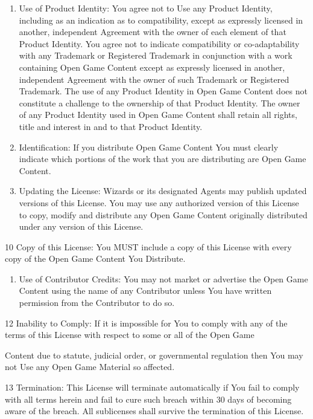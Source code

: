 \begin{multicols}{2}
\begin{enumerate}
\def\labelenumi{\arabic{enumi}.}
\setcounter{enumi}{6}
\item
  Use of Product Identity: You agree not to Use any Product Identity,
  including as an indication as to compatibility, except as expressly
  licensed in another, independent Agreement with the owner of each
  element of that Product Identity. You agree not to indicate
  compatibility or co-adaptability with any Trademark or Registered
  Trademark in conjunction with a work containing Open Game Content
  except as expressly licensed in another, independent Agreement with
  the owner of such Trademark or Registered Trademark. The use of any
  Product Identity in Open Game Content does not constitute a challenge
  to the ownership of that Product Identity. The owner of any Product
  Identity used in Open Game Content shall retain all rights, title and
  interest in and to that Product Identity.
\item
  Identification: If you distribute Open Game Content You must clearly
  indicate which portions of the work that you are distributing are Open
  Game Content.
\item
  Updating the License: Wizards or its designated Agents may publish
  updated versions of this License. You may use any authorized version
  of this License to copy, modify and distribute any Open Game Content
  originally distributed under any version of this License.
\end{enumerate}


10 Copy of this License: You MUST include a copy of this License with
every copy of the Open Game Content You Distribute.


\begin{enumerate}
\def\labelenumi{\arabic{enumi}.}
\setcounter{enumi}{10}
\item
  Use of Contributor Credits: You may not market or advertise the Open
  Game Content using the name of any Contributor unless You have written
  permission from the Contributor to do so.
\end{enumerate}


12 Inability to Comply: If it is impossible for You to comply with any
of the terms of this License with respect to some or all of the Open
Game


Content due to statute, judicial order, or governmental regulation then
You may not Use any Open Game Material so affected.

13 Termination: This License will terminate automatically if You fail to
comply with all terms herein and fail to cure such breach within 30 days
of becoming aware of the breach. All sublicenses shall survive the
termination of this License.


\end{multicols}
